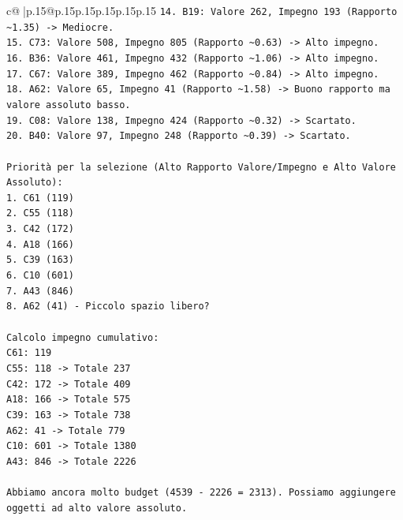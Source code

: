 \documentclass{article}
\begin{document}
{\begin{supertabular}{c@{$\;$}|p{.15\linewidth}@{}p{.15\linewidth}p{.15\linewidth}p{.15\linewidth}p{.15\linewidth}p{.15\linewidth}}
{{{\texttt{14. B19: Valore 262, Impegno 193 (Rapporto \textasciitilde{}1.35) {-}> Mediocre.} \\
\texttt{15. C73: Valore 508, Impegno 805 (Rapporto \textasciitilde{}0.63) {-}> Alto impegno.} \\
\texttt{16. B36: Valore 461, Impegno 432 (Rapporto \textasciitilde{}1.06) {-}> Alto impegno.} \\
\texttt{17. C67: Valore 389, Impegno 462 (Rapporto \textasciitilde{}0.84) {-}> Alto impegno.} \\
\texttt{18. A62: Valore 65, Impegno 41 (Rapporto \textasciitilde{}1.58) {-}> Buono rapporto ma valore assoluto basso.} \\
\texttt{19. C08: Valore 138, Impegno 424 (Rapporto \textasciitilde{}0.32) {-}> Scartato.} \\
\texttt{20. B40: Valore 97, Impegno 248 (Rapporto \textasciitilde{}0.39) {-}> Scartato.} \\
\\ 
\texttt{Priorità per la selezione (Alto Rapporto Valore/Impegno e Alto Valore Assoluto):} \\
\texttt{1. C61 (119)} \\
\texttt{2. C55 (118)} \\
\texttt{3. C42 (172)} \\
\texttt{4. A18 (166)} \\
\texttt{5. C39 (163)} \\
\texttt{6. C10 (601)} \\
\texttt{7. A43 (846)} \\
\texttt{8. A62 (41) {-} Piccolo spazio libero?} \\
\\ 
\texttt{Calcolo impegno cumulativo:} \\
\texttt{C61: 119} \\
\texttt{C55: 118 {-}> Totale 237} \\
\texttt{C42: 172 {-}> Totale 409} \\
\texttt{A18: 166 {-}> Totale 575} \\
\texttt{C39: 163 {-}> Totale 738} \\
\texttt{A62: 41 {-}> Totale 779} \\
\texttt{C10: 601 {-}> Totale 1380} \\
\texttt{A43: 846 {-}> Totale 2226} \\
\\ 
\texttt{Abbiamo ancora molto budget (4539 {-} 2226 = 2313). Possiamo aggiungere oggetti ad alto valore assoluto.} \\
}}}
\end{supertabular}}
\end{document}
